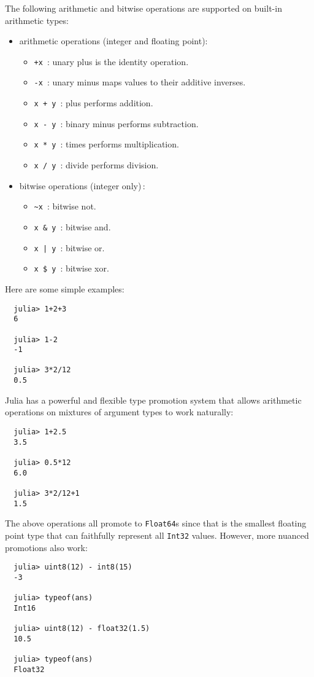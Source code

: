 \documentclass{article}
\begin{document}
The following arithmetic and bitwise operations are supported on built-in arithmetic types:
\begin{itemize}
  \item arithmetic operations (integer and floating point):
  \begin{itemize}
    \item \verb|+x|~: unary plus is the identity operation.
    \item \verb|-x|~: unary minus maps values to their additive inverses.
    \item \verb|x + y|~: plus performs addition.
    \item \verb|x - y|~: binary minus performs subtraction.
    \item \verb|x * y|~: times performs multiplication.
    \item \verb|x / y|~: divide performs division.
  \end{itemize}
  \item bitwise operations (integer only)\,:
  \begin{itemize}
    \item \verb|~x|~: bitwise not.
    \item \verb|x & y|~: bitwise and.
    \item \texttt{x | y}~: bitwise or.
    \item \verb|x $ y|~: bitwise xor.
  \end{itemize}
\end{itemize}
Here are some simple examples:
\begin{verbatim}
  julia> 1+2+3
  6

  julia> 1-2
  -1

  julia> 3*2/12
  0.5
\end{verbatim}
Julia has a powerful and flexible type promotion system that allows arithmetic operations on mixtures of argument types to work naturally:
\begin{verbatim}
  julia> 1+2.5
  3.5

  julia> 0.5*12
  6.0

  julia> 3*2/12+1
  1.5
\end{verbatim}
The above operations all promote to \verb|Float64|s since that is the smallest floating point type that can faithfully represent all \verb|Int32| values.
However, more nuanced promotions also work:
\begin{verbatim}
  julia> uint8(12) - int8(15)
  -3

  julia> typeof(ans)
  Int16

  julia> uint8(12) - float32(1.5)
  10.5

  julia> typeof(ans)
  Float32
\end{verbatim}
\end{document}

